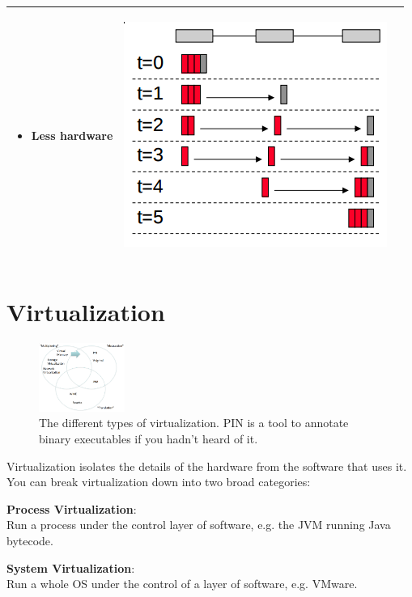 \begin{center}
\begin{tabular}{| m{2cm} | m{5cm} | c |}
\begin{itemize}
      \item Less hardware
    \end{itemize} & 
    \begin{minipage}{.3\textwidth}
      \begin{center}
        \includegraphics[width=0.5\linewidth]{images/wormhole}
      \end{center}
    \end{minipage} \\ \hline
  \end{tabular}
\end{center}

\section{Virtualization}

\begin{figure}
  \centering
  \includegraphics[width=0.25\textwidth]{images/types-of-virtualization}
  \caption{The different types of virtualization. PIN is a tool to annotate
  binary executables if you hadn't heard of it.}
  \label{types-of-virtualization}
\end{figure}

Virtualization isolates the details of the hardware from the software that uses
it. You can break virtualization down into two broad categories:

\begin{description}
  \item \textbf{Process Virtualization}:\\
    Run a process under the control layer of software, e.g. the JVM running Java
    bytecode.
  \item \textbf{System Virtualization}:\\
    Run a whole OS under the control of a layer of software, e.g. VMware.
\end{description}


